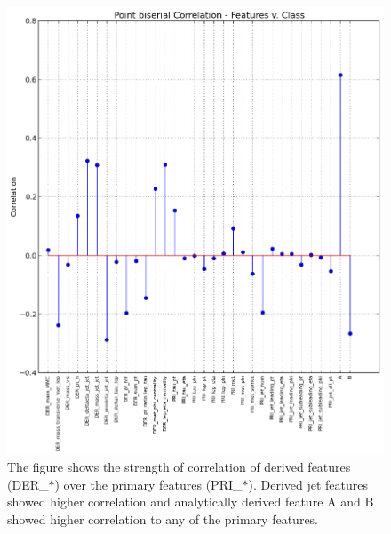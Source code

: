 \documentclass[final,3p,times,onecolumn]{elsarticle}
\begin{document}
\begin{figure}
\hspace{1.8cm}
\includegraphics[scale=0.6]{Images/BiSerialCorr.png}
\caption{The figure shows the strength of correlation of derived features (DER\_$*$) over the primary features (PRI\_$*$). Derived jet features showed higher correlation and analytically derived feature A and B showed higher correlation to any of the primary features.}
\label{biserial}
\end{figure}
\end{document}
